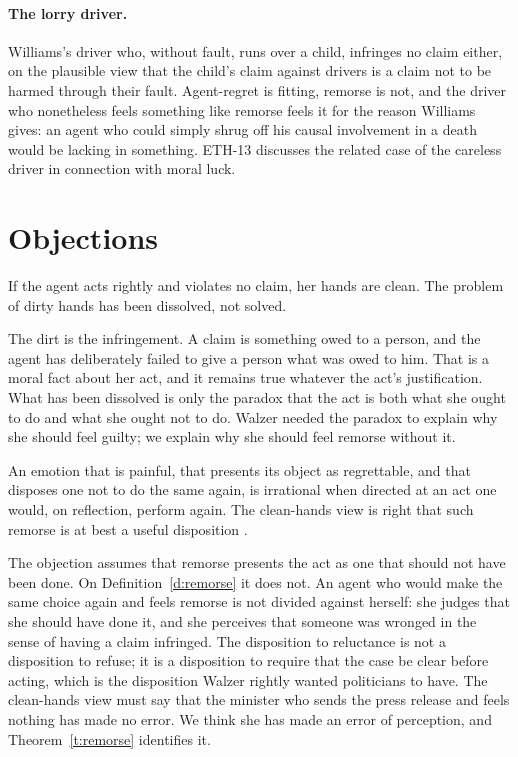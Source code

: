 \documentclass{situationist-preprint}
\begin{document}
\paragraph{The lorry driver.} Williams's driver who, without fault, runs over a child, infringes no claim either, on the plausible view that the child's claim against drivers is a claim not to be harmed through their fault. Agent-regret is fitting, remorse is not, and the driver who nonetheless feels something like remorse feels it for the reason Williams gives: an agent who could simply shrug off his causal involvement in a death would be lacking in something. ETH-13 discusses the related case of the careless driver in connection with moral luck.

\section{Objections}

\begin{objection}
If the agent acts rightly and violates no claim, her hands are clean. The problem of dirty hands has been dissolved, not solved.
\end{objection}

\begin{reply}
The dirt is the infringement. A claim is something owed to a person, and the agent has deliberately failed to give a person what was owed to him. That is a moral fact about her act, and it remains true whatever the act's justification. What has been dissolved is only the paradox that the act is both what she ought to do and what she ought not to do. Walzer needed the paradox to explain why she should feel guilty; we explain why she should feel remorse without it.
\end{reply}

\begin{objection}[Irrationality]
An emotion that is painful, that presents its object as regrettable, and that disposes one not to do the same again, is irrational when directed at an act one would, on reflection, perform again. The clean-hands view is right that such remorse is at best a useful disposition \citep{Hare1981}.
\end{objection}

\begin{reply}
The objection assumes that remorse presents the act as one that should not have been done. On Definition~\ref{d:remorse} it does not. An agent who would make the same choice again and feels remorse is not divided against herself: she judges that she should have done it, and she perceives that someone was wronged in the sense of having a claim infringed. The disposition to reluctance is not a disposition to refuse; it is a disposition to require that the case be clear before acting, which is the disposition Walzer rightly wanted politicians to have. The clean-hands view must say that the minister who sends the press release and feels nothing has made no error. We think she has made an error of perception, and Theorem~\ref{t:remorse} identifies it.
\end{reply}
\end{document}
